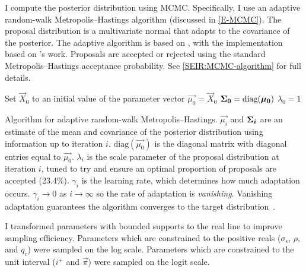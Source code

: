 \documentclass[thesis.tex]{subfiles}
\begin{document}
I compute the posterior distribution using MCMC.
Specifically, I use an adaptive random-walk Metropolis--Hastings algorithm (discussed in \cref{E-MCMC}).
The proposal distribution is a multivariate normal that adapts to the covariance of the posterior.
The adaptive algorithm is based on \textcite[algorithm 4]{andrieuTutorial}, with the implementation based on \textcite{ghoshApproximate}'s work.
Proposals are accepted or rejected using the standard Metropolis--Hastings acceptance probability.
See \cref{SEIR:MCMC-algorithm} for full details.

\begin{algorithm}
 Set $\vec{X}_0$ to an initial value of the parameter vector \;
 $\vec{\mu_0} = \vec{X}_0$ \;
 $\bm{\Sigma_0} = \text{diag}(\bm{\mu_0})$ \;
 $\lambda_0 = 1$ \;
 \caption{Algorithm for adaptive random-walk Metropolis--Hastings. $\vec{\mu_i}$ and $\bm{\Sigma_i}$ are an estimate of the mean and covariance of the posterior distribution using information up to iteration $i$. $\text{diag}(\vec{\mu_0})$ is the diagonal matrix with diagonal entries equal to $\vec{\mu_0}$. $\lambda_i$ is the scale parameter of the proposal distribution at iteration $i$, tuned to try and ensure an optimal proportion of proposals are accepted (23.4\%). $\gamma_i$ is the learning rate, which determines how much adaptation occurs. $\gamma_i \to 0$ as $i \to \infty$ so the rate of adaptation is \emph{vanishing}. Vanishing adaptation guarantees the algorithm converges to the target distribution~\autocite[section 3]{andrieuTutorial}.}
 \label{SEIR:MCMC-algorithm}
\end{algorithm}

I transformed parameters with bounded supports to the real line to improve sampling efficiency.
Parameters which are constrained to the positive reals ($\sigma_\epsilon$, $\rho$, and $q_c$) were sampled on the log scale.
Parameters which are constrained to the unit interval ($i^+$ and $\vec{\pi}$) were sampled on the logit scale.
\end{document}
